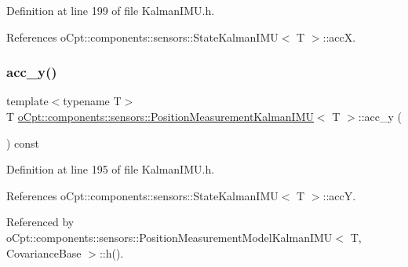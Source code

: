 Definition at line 199 of file Kalman\+I\+M\+U.\+h.



References o\+Cpt\+::components\+::sensors\+::\+State\+Kalman\+I\+M\+U$<$ T $>$\+::accX.

\hypertarget{classo_cpt_1_1components_1_1sensors_1_1_position_measurement_kalman_i_m_u_abbd04b0e58d5041e2f69f79ccdd09b69}{}\label{classo_cpt_1_1components_1_1sensors_1_1_position_measurement_kalman_i_m_u_abbd04b0e58d5041e2f69f79ccdd09b69} 
\subsubsection{\texorpdfstring{acc\+\_\+y()}{acc\_y()}\hspace{0.1cm}{\footnotesize\ttfamily [1/2]}}
{\footnotesize\ttfamily template$<$typename T$>$ \\
T \hyperlink{classo_cpt_1_1components_1_1sensors_1_1_position_measurement_kalman_i_m_u}{o\+Cpt\+::components\+::sensors\+::\+Position\+Measurement\+Kalman\+I\+MU}$<$ T $>$\+::acc\+\_\+y (\begin{DoxyParamCaption}{ }\end{DoxyParamCaption}) const\hspace{0.3cm}{\ttfamily [inline]}}



Definition at line 195 of file Kalman\+I\+M\+U.\+h.



References o\+Cpt\+::components\+::sensors\+::\+State\+Kalman\+I\+M\+U$<$ T $>$\+::accY.



Referenced by o\+Cpt\+::components\+::sensors\+::\+Position\+Measurement\+Model\+Kalman\+I\+M\+U$<$ T, Covariance\+Base $>$\+::h().

